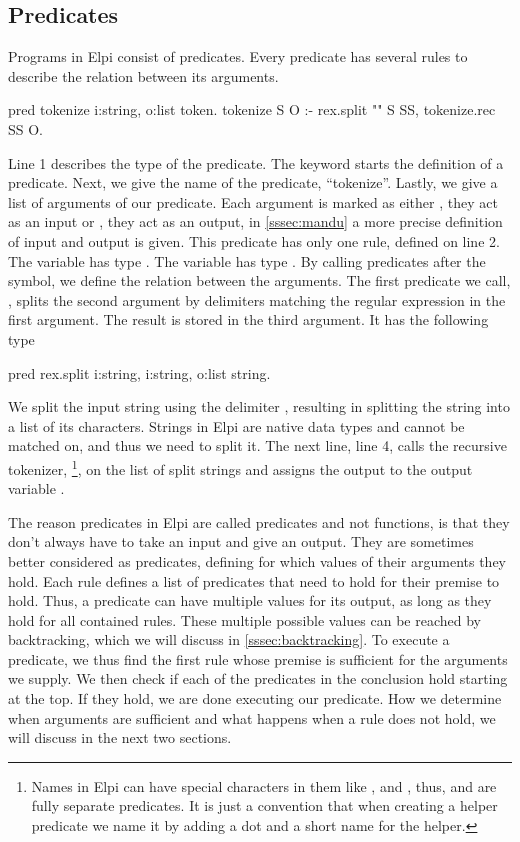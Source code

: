 \documentclass[thesis.tex]{subfiles}
\begin{document}
{{\subsection{Predicates} \label{sssec:predicates}
Programs in Elpi consist of predicates. Every predicate has several rules to describe the relation between its arguments.
\begin{elpicode}
  pred tokenize i:string, o:list token.
  tokenize S O :- 
    rex.split "" S SS,
    tokenize.rec SS O.
\end{elpicode}
Line 1 describes the type of the predicate. The keyword  starts the definition of a predicate. Next, we give the name of the predicate, ``tokenize''. Lastly, we give a list of arguments of our predicate. Each argument is marked as either , they act as an input or , they act as an output, in \cref{sssec:mandu} a more precise definition of input and output is given. This predicate has only one rule, defined on line 2. The variable  has type . The variable  has type . By calling predicates after the \elpii{:-} symbol, we define the relation between the arguments. The first predicate we call, , splits the second argument by delimiters matching the regular expression in the first argument. The result is stored in the third argument. It has the following type
\begin{elpicode}
  pred rex.split i:string, i:string, o:list string.
\end{elpicode}
We split the input string using the delimiter , resulting in splitting the string into a list of its characters. Strings in Elpi are native data types and cannot be matched on, and thus we need to split it. The next line, line 4, calls the recursive tokenizer, \footnote{Names in Elpi can have special characters in them like , \elpii{-} and \elpii{>}, thus,  and  are fully separate predicates. It is just a convention that when creating a helper predicate we name it by adding a dot and a short name for the helper.}, on the list of split strings and assigns the output to the output variable .

The reason predicates in Elpi are called predicates and not functions, is that they don't always have to take an input and give an output. They are sometimes better considered as predicates, defining for which values of their arguments they hold. Each rule defines a list of predicates that need to hold for their premise to hold. Thus, a predicate can have multiple values for its output, as long as they hold for all contained rules. These multiple possible values can be reached by backtracking, which we will discuss in \cref{sssec:backtracking}. To execute a predicate, we thus find the first rule whose premise is sufficient for the arguments we supply. We then check if each of the predicates in the conclusion hold starting at the top. If they hold, we are done executing our predicate. How we determine when arguments are sufficient and what happens when a rule does not hold, we will discuss in the next two sections.

}}
\end{document}

